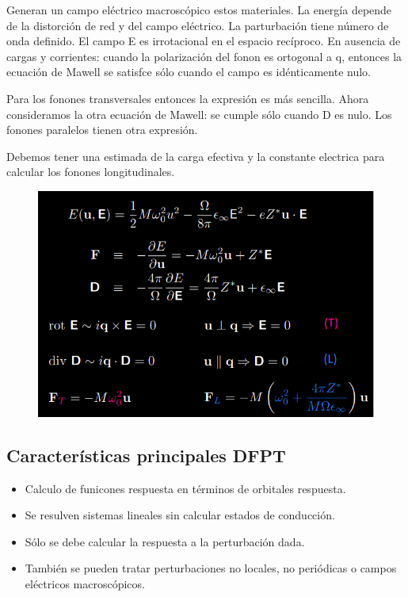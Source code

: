  Generan un campo eléctrico macroscópico estos materiales. La energía depende de la distorción de red y del campo eléctrico. La parturbación tiene número de onda definido. El campo E es irrotacional en el espacio recíproco. En ausencia de cargas y corrientes: cuando la polarización del fonon es ortogonal a q, entonces la ecuación de Mawell se satisfce sólo cuando el campo es idénticamente nulo.

  Para los fonones transversales entonces la expresión es más sencilla. Ahora consideramos la otra ecuación de Mawell: se cumple sólo cuando D es nulo. Los fonones paralelos tienen otra expresión.

  Debemos tener una estimada de la carga efectiva y la constante electrica para calcular los fonones longitudinales.

  \begin{figure}[H]
    \centering
    \includegraphics[scale = 0.5]{figs/D5/fonones_polares.png}
  \end{figure}

\subsection{Características principales DFPT}

  \begin{itemize}
    \item Calculo de funicones respuesta en términos de orbitales respuesta.
    \item Se resulven sistemas lineales sin calcular estados de conducción.
    \item Sólo se debe calcular la respuesta a la perturbación dada.
    \item También se pueden tratar perturbaciones no locales, no periódicas o campos eléctricos macroscópicos.
  \end{itemize}


